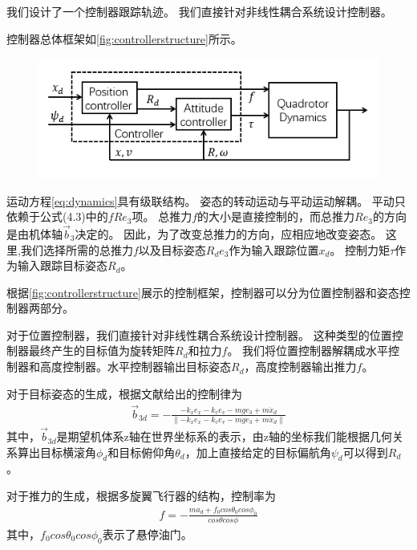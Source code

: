 \documentclass[
  type=master
]{gdutthesis}
\begin{document}
我们设计了一个控制器跟踪轨迹。
我们直接针对非线性耦合系统设计控制器。

控制器总体框架如\autoref{fig:controllerstructure}所示。
\begin{figure}[htbp]
	\centering
	\includegraphics[width=1.0\textwidth]{屏幕截图 2022-04-04 222027.png}
	\label{fig:controllerstructure}
\end{figure}
运动方程\autoref{eq:dynamics}具有级联结构。
姿态的转动运动与平动运动解耦。
平动只依赖于公式(4.3)中的$fRe_3$项。
总推力$f$的大小是直接控制的，而总推力$Re_3$的方向是由机体轴$\vec{b}_3$决定的。
因此，为了改变总推力的方向，应相应地改变姿态。
这里,我们选择所需的总推力$f$以及目标姿态$R_d e_3$作为输入跟踪位置$x_d$。
控制力矩$\tau$作为输入跟踪目标姿态$R_d$。

根据\autoref{fig:controllerstructure}展示的控制框架，控制器可以分为位置控制器和姿态控制器两部分。

对于位置控制器，我们直接针对非线性耦合系统设计控制器。
这种类型的位置控制器最终产生的目标值为旋转矩阵$R_d$和拉力$f$。
我们将位置控制器解耦成水平控制器和高度控制器。水平控制器输出目标姿态$R_d$，高度控制器输出推力$f$。

对于目标姿态的生成，根据文献\cite{lee2010geometric}给出的控制律为
\begin{gather}\label{eq:Horizontalcontrol}
	\vec{b}_{3d} = -\frac{-k_x e_x - k_v e_v - mge_3 + m\ddot{x}_d}{\left\|-k_x e_x - k_v e_v - mge_3 + m\ddot{x}_d\right\|}
\end{gather}
其中，$\vec{b}_{3d}$是期望机体系z轴在世界坐标系的表示，由z轴的坐标我们能根据几何关系算出目标横滚角$\phi_d$和目标俯仰角$\theta_d$，加上直接给定的目标偏航角$\psi_d$可以得到$R_d$。

对于推力的生成，根据多旋翼飞行器的结构，控制率为
\begin{gather}\label{eq:AltitudeControl}
	f = -\frac{ma_d + f_0 cos\theta_0 cos\phi_0}{cos\theta cos\phi}
\end{gather}
其中，$f_0 cos\theta_0 cos\phi_0$表示了悬停油门。
\end{document}
